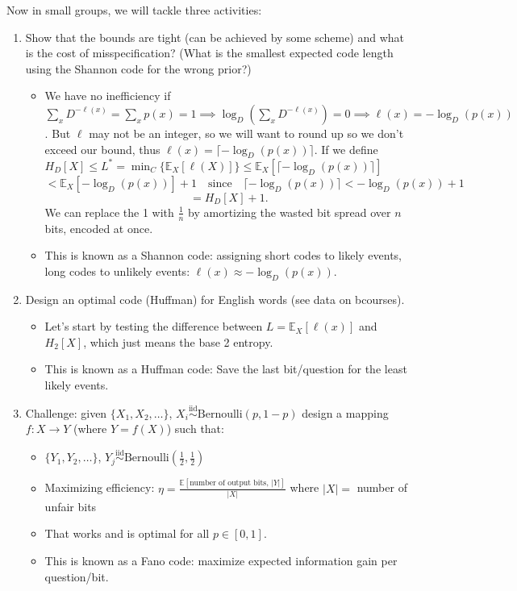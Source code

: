 Now in small groups, we will tackle three activities:

\begin{enumerate}
    \item Show that the bounds are tight (can be achieved by some scheme) and what is the cost of misspecification? (What is the smallest expected code length using the Shannon code for the wrong prior?)
    \begin{itemize}
        \item We have no inefficiency if \( \sum_x D^{- \ell(x)} = \sum_x p(x) = 1 \implies \log_D\left(\sum_x D^{- \ell(x)}\right) = 0 \implies \ell(x) = -\log_D(p(x)) \). But \( \ell \) may not be an integer, so we will want to round up so we don’t exceed our bound, thus \( \ell(x) = \lceil -\log_D(p(x))\rceil \). If we define \( H_D[X] \leq L^* = \min_C \{ \mathbb{E}_X[\ell(X)] \} \leq \mathbb{E}_X[\lceil -\log_D(p(x))\rceil] \)
        \[ < \mathbb{E}_X[-\log_D(p(x))] + 1 \quad \text{since} \quad \lceil -\log_D(p(x))\rceil < -\log_D(p(x)) + 1 \]
        \[ = H_D[X] + 1. \]
        We can replace the 1 with \( \frac{1}{n} \) by amortizing the wasted bit spread over \( n \) bits, encoded at once.
        \item This is known as a Shannon code: assigning short codes to likely events, long codes to unlikely events: \( \ell(x) \approx -\log_D(p(x)) \).
    \end{itemize}
    \item Design an optimal code (Huffman) for English words (see data on bcourses).
    \begin{itemize}
        \item Let’s start by testing the difference between \( L = \mathbb{E}_X[\ell(x)] \) and \( H_2[X] \), which just means the base 2 entropy.
        \item This is known as a Huffman code: Save the last bit/question for the least likely events.
    \end{itemize}
    \item Challenge: given \( \{X_1, X_2, \ldots\} \), \( X_i \stackrel{\text{iid}}{\sim} \text{Bernoulli}(p, 1-p) \) design a mapping \( f: X \to Y \) (where \( Y=f(X) \)) such that:
    \begin{itemize}
        \item \( \{Y_1, Y_2, \ldots\} \), \( Y_j \stackrel{\text{iid}}{\sim} \text{Bernoulli}\left(\frac{1}{2}, \frac{1}{2}\right) \)
        \item Maximizing efficiency: \( \eta = \frac{\mathbb{E}[\text{number of output bits, } |Y|]}{|X|} \) where \( |X| = \) number of unfair bits
        \item That works and is optimal for all \( p \in [0, 1] \).
        \item This is known as a Fano code: maximize expected information gain per question/bit.
    \end{itemize}
\end{enumerate}
